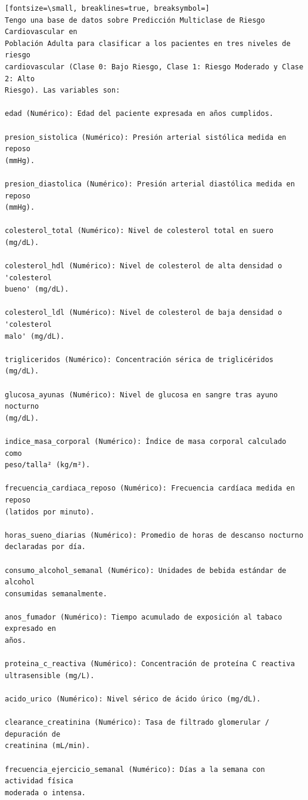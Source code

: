 \documentclass[12pt,a4paper,oneside]{book}
\begin{document}
\begin{iaprompt}
\begin{Verbatim}[fontsize=\small, breaklines=true, breaksymbol=]
Tengo una base de datos sobre Predicción Multiclase de Riesgo Cardiovascular en
Población Adulta para clasificar a los pacientes en tres niveles de riesgo
cardiovascular (Clase 0: Bajo Riesgo, Clase 1: Riesgo Moderado y Clase 2: Alto
Riesgo). Las variables son:

edad (Numérico): Edad del paciente expresada en años cumplidos.

presion_sistolica (Numérico): Presión arterial sistólica medida en reposo
(mmHg).

presion_diastolica (Numérico): Presión arterial diastólica medida en reposo
(mmHg).

colesterol_total (Numérico): Nivel de colesterol total en suero (mg/dL).

colesterol_hdl (Numérico): Nivel de colesterol de alta densidad o 'colesterol
bueno' (mg/dL).

colesterol_ldl (Numérico): Nivel de colesterol de baja densidad o 'colesterol
malo' (mg/dL).

trigliceridos (Numérico): Concentración sérica de triglicéridos (mg/dL).

glucosa_ayunas (Numérico): Nivel de glucosa en sangre tras ayuno nocturno
(mg/dL).

indice_masa_corporal (Numérico): Índice de masa corporal calculado como
peso/talla² (kg/m²).

frecuencia_cardiaca_reposo (Numérico): Frecuencia cardíaca medida en reposo
(latidos por minuto).

horas_sueno_diarias (Numérico): Promedio de horas de descanso nocturno
declaradas por día.

consumo_alcohol_semanal (Numérico): Unidades de bebida estándar de alcohol
consumidas semanalmente.

anos_fumador (Numérico): Tiempo acumulado de exposición al tabaco expresado en
años.

proteina_c_reactiva (Numérico): Concentración de proteína C reactiva
ultrasensible (mg/L).

acido_urico (Numérico): Nivel sérico de ácido úrico (mg/dL).

clearance_creatinina (Numérico): Tasa de filtrado glomerular / depuración de
creatinina (mL/min).

frecuencia_ejercicio_semanal (Numérico): Días a la semana con actividad física
moderada o intensa.


\end{Verbatim}
\end{iaprompt}
\end{document}
